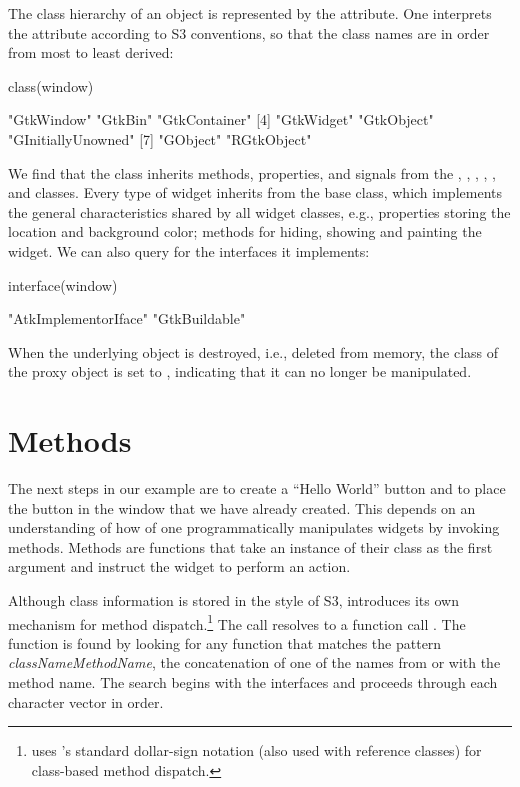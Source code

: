 The class hierarchy of an object is represented by the
 attribute. One interprets the attribute according to S3
conventions, so that the class names are in order from most to least
derived:
\begin{Schunk}
\begin{Sinput}
 class(window)
\end{Sinput}
\end{Schunk}
\begin{Soutput}
[1] "GtkWindow"   "GtkBin"      "GtkContainer"     
[4] "GtkWidget"   "GtkObject"   "GInitiallyUnowned"
[7] "GObject"     "RGtkObject" 
\end{Soutput}
%
We find that the  class inherits methods,
properties, and signals from the , ,
, , , and
 classes. Every type of  widget inherits from
the base  class, which implements the general
characteristics shared by all widget classes, e.g., properties storing
the location and background color; methods for hiding, showing and
painting the widget. We can also query  for the
interfaces it implements:
\begin{Schunk}
\begin{Sinput}
 interface(window)
\end{Sinput}
\begin{Soutput}
[1] "AtkImplementorIface" "GtkBuildable"       
\end{Soutput}
\end{Schunk}

When the underlying \GTK\/ object is destroyed, i.e., deleted
from memory, the class of the proxy object is set to ,
indicating that it can no longer be manipulated.

\section{Methods}

The next steps in our example are to create a ``Hello World'' button
and to place the button in the window that we have already
created. This depends on an understanding of how of one
programmatically manipulates widgets by invoking methods.  Methods are
functions that take an instance of their class as the first argument
and instruct the widget to perform an action.

Although class information is stored in the style of S3, 
introduces its own mechanism for method
dispatch.\footnote{ uses \R's standard dollar-sign
  notation (also used with reference classes) for class-based method
  dispatch.}  The call   resolves to a function
call . The function is found by looking for any
function that matches the pattern \emph{classNameMethodName}, the
concatenation of one of the names from  or
 with the method name. The search begins with the
interfaces and proceeds through each character vector in order.

